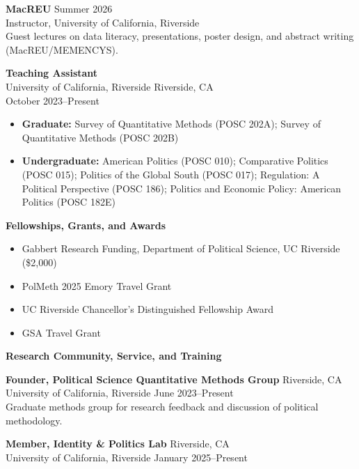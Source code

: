 \documentclass[11pt]{article}
\newcommand{\cvsection}[1]{%
  \par\addvspace{12pt}
  \Needspace{5\baselineskip}
  {\large\sffamily\bfseries\color{cvaccent}#1}\par\nobreak
  \vspace{3pt}{\color{cvrule}\hrule height 0.3pt}\nobreak
  \vspace{8pt}
}
\newcommand{\cvdate}[1]{{\small\color{cvmuted}#1}}
\begin{document}
\vspace{0.25cm}
\textbf{MacREU} \hfill \cvdate{Summer 2026}\\
Instructor, University of California, Riverside\\
Guest lectures on data literacy, presentations, poster design, and abstract writing (MacREU/MEMENCYS).

\vspace{0.25cm}

\textbf{Teaching Assistant}\\
University of California, Riverside \hfill Riverside, CA\\
\cvdate{October 2023--Present}

\begin{itemize}
    \item \textbf{Graduate:} Survey of Quantitative Methods (POSC 202A); Survey of Quantitative Methods (POSC 202B)
    \item \textbf{Undergraduate:} American Politics (POSC 010); Comparative Politics (POSC 015); Politics of the Global South (POSC 017); Regulation: A Political Perspective (POSC 186); Politics and Economic Policy: American Politics (POSC 182E)
\end{itemize}

\cvsection{Fellowships, Grants, and Awards}

\begin{itemize}
    \item Gabbert Research Funding, Department of Political Science, UC Riverside (\$2,000)
    \item PolMeth 2025 Emory Travel Grant
    \item UC Riverside Chancellor's Distinguished Fellowship Award
    \item GSA Travel Grant
\end{itemize}

\cvsection{Research Community, Service, and Training}

\textbf{Founder, Political Science Quantitative Methods Group} \hfill Riverside, CA\\
University of California, Riverside \hfill \cvdate{June 2023--Present}\\
Graduate methods group for research feedback and discussion of political methodology.

\vspace{0.25cm}
\textbf{Member, Identity \& Politics Lab} \hfill Riverside, CA\\
University of California, Riverside \hfill \cvdate{January 2025--Present}
\end{document}
